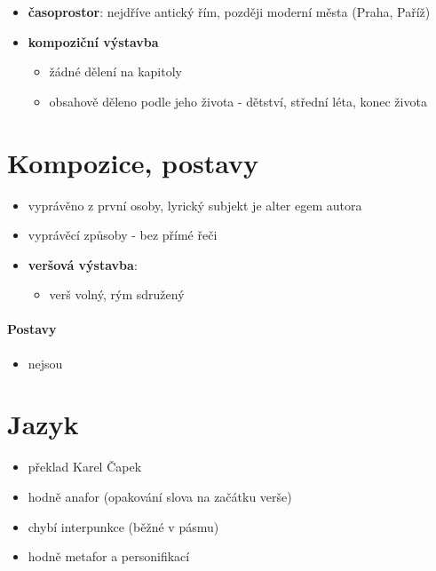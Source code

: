 \documentclass[10pt,a4paper]{article}
\begin{document}
\begin{itemize}
\begin{itemize}
\begin{itemize}
\begin{itemize}
			\end{itemize}
		\end{itemize}
	\end{itemize}
\item \textbf{časoprostor}: nejdříve antický řím, později moderní města (Praha, Paříž)
	\item \textbf{kompoziční výstavba}
	\begin{itemize}
		\item žádné dělení na kapitoly
		\item obsahově děleno podle jeho života - dětství, střední léta, konec života
	\end{itemize}
\end{itemize}
\section*{Kompozice, postavy}
\begin{itemize}
\item vyprávěno z první osoby, lyrický subjekt je alter egem autora 
\item vyprávěcí způsoby - bez přímé řeči
\item \textbf{veršová výstavba}:	
	\begin{itemize}
	\item verš volný, rým sdružený
	\end{itemize}
\end{itemize}

\paragraph{Postavy}
\begin{itemize}
\item nejsou
\end{itemize}
\section*{Jazyk}
\begin{itemize}
\item překlad Karel Čapek
\item hodně anafor (opakování slova na začátku verše)
\item chybí interpunkce (běžné v pásmu)
\item hodně metafor a personifikací

\end{itemize}
\end{document}
